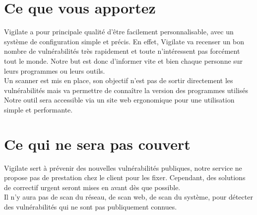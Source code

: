 \section{Ce que vous apportez}
\thispagestyle{plain}

Vigilate a pour principale qualité d’être facilement personnalisable, avec un système de configuration simple et précis. En effet, Vigilate va recenser un bon nombre de vulnérabilités très rapidement et toute n’intéressent pas forcément tout le monde. Notre but est donc d’informer vite et bien chaque personne sur leurs programmes ou leurs outils.\\
Un scanner est mis en place, son objectif n'est pas de sortir directement les vulnérabilités mais va permettre de connaître la version des programmes utilisés\\
Notre outil sera accessible via un site web ergonomique pour une utilisation simple et performante.\\

\section{Ce qui ne sera pas couvert}
\thispagestyle{plain}
Vigilate sert à prévenir des nouvelles vulnérabilités publiques, notre service ne propose pas de prestation chez le client pour les fixer. Cependant, des solutions de correctif urgent seront mises en avant dès que possible.\\
Il n’y aura pas de scan du réseau, de scan web, de scan du système, pour détecter des vulnérabilités qui ne sont pas publiquement connues.\\
